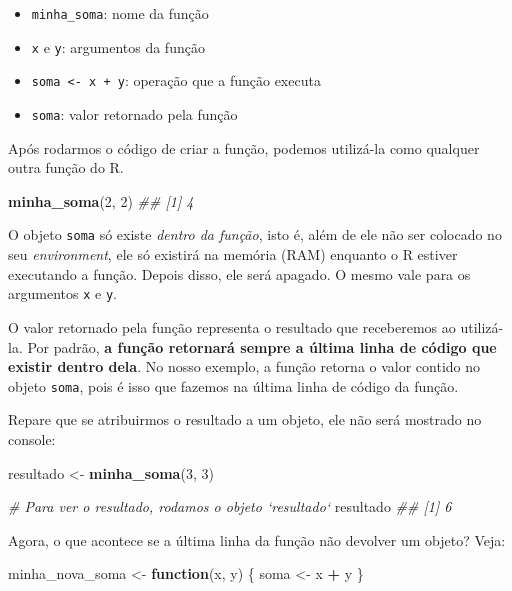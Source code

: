 \documentclass[]{book}
\newenvironment{Shaded}{\begin{snugshade}}{\end{snugshade}}
\newcommand{\CommentTok}[1]{\textcolor[rgb]{0.56,0.35,0.01}{\textit{#1}}}
\newcommand{\ControlFlowTok}[1]{\textcolor[rgb]{0.13,0.29,0.53}{\textbf{#1}}}
\newcommand{\DecValTok}[1]{\textcolor[rgb]{0.00,0.00,0.81}{#1}}
\newcommand{\KeywordTok}[1]{\textcolor[rgb]{0.13,0.29,0.53}{\textbf{#1}}}
\newcommand{\NormalTok}[1]{#1}
\newcommand{\OperatorTok}[1]{\textcolor[rgb]{0.81,0.36,0.00}{\textbf{#1}}}
\newcommand{\StringTok}[1]{\textcolor[rgb]{0.31,0.60,0.02}{#1}}
\providecommand{\tightlist}{%
  \setlength{\itemsep}{0pt}\setlength{\parskip}{0pt}}
\begin{document}
\begin{itemize}
\tightlist
\item
  \texttt{minha\_soma}: nome da função
\item
  \texttt{x} e \texttt{y}: argumentos da função
\item
  \texttt{soma\ \textless{}-\ x\ +\ y}: operação que a função executa
\item
  \texttt{soma}: valor retornado pela função
\end{itemize}

Após rodarmos o código de criar a função, podemos utilizá-la como qualquer outra função do R.

\begin{Shaded}
\begin{Highlighting}[]
\KeywordTok{minha_soma}\NormalTok{(}\DecValTok{2}\NormalTok{, }\DecValTok{2}\NormalTok{)}
\CommentTok{## [1] 4}
\end{Highlighting}
\end{Shaded}

O objeto \texttt{soma} só existe \emph{dentro da função}, isto é, além de ele não ser colocado no seu \emph{environment}, ele só existirá na memória (RAM) enquanto o R estiver executando a função. Depois disso, ele será apagado. O mesmo vale para os argumentos \texttt{x} e \texttt{y}.

O valor retornado pela função representa o resultado que receberemos ao utilizá-la. Por padrão, \textbf{a função retornará sempre a última linha de código que existir dentro dela}. No nosso exemplo, a função retorna o valor contido no objeto \texttt{soma}, pois é isso que fazemos na última linha de código da função.

Repare que se atribuirmos o resultado a um objeto, ele não será mostrado no console:

\begin{Shaded}
\begin{Highlighting}[]
\NormalTok{resultado <-}\StringTok{ }\KeywordTok{minha_soma}\NormalTok{(}\DecValTok{3}\NormalTok{, }\DecValTok{3}\NormalTok{)}

\CommentTok{# Para ver o resultado, rodamos o objeto `resultado`}
\NormalTok{resultado}
\CommentTok{## [1] 6}
\end{Highlighting}
\end{Shaded}

Agora, o que acontece se a última linha da função não devolver um objeto? Veja:

\begin{Shaded}
\begin{Highlighting}[]
\NormalTok{minha_nova_soma <-}\StringTok{ }\ControlFlowTok{function}\NormalTok{(x, y) \{}
\NormalTok{  soma <-}\StringTok{ }\NormalTok{x }\OperatorTok{+}\StringTok{ }\NormalTok{y}
\NormalTok{\}}
\end{Highlighting}
\end{Shaded}
\end{document}
